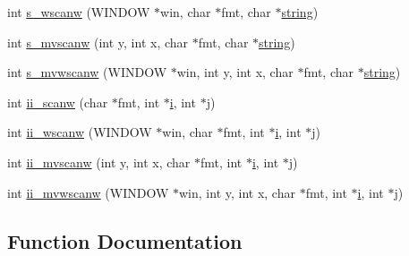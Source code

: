 \begin{DoxyCompactItemize}
\item 
int \hyperlink{C-macros_8c_a261b2a08296fc9699afe31cc2c578410}{s\+\_\+wscanw} (W\+I\+N\+D\+OW $\ast$win, char $\ast$fmt, char $\ast$\hyperlink{what__overview_81_8txt_a7d189cc480786c3c65688ced463aedcb}{string})
\item 
int \hyperlink{C-macros_8c_aadefc5909b2feb200bb34f11b0dd18d1}{s\+\_\+mvscanw} (int y, int x, char $\ast$fmt, char $\ast$\hyperlink{what__overview_81_8txt_a7d189cc480786c3c65688ced463aedcb}{string})
\item 
int \hyperlink{C-macros_8c_ad40ae826be88925237db3a46518ca603}{s\+\_\+mvwscanw} (W\+I\+N\+D\+OW $\ast$win, int y, int x, char $\ast$fmt, char $\ast$\hyperlink{what__overview_81_8txt_a7d189cc480786c3c65688ced463aedcb}{string})
\item 
int \hyperlink{C-macros_8c_a13c589c66da48838bef7ced902997126}{ii\+\_\+scanw} (char $\ast$fmt, int $\ast$\hyperlink{intro__blas1_83_8txt_a8ba82a50c0c2c12d5f6a77f7e4651c0b}{i}, int $\ast$\hyperlink{exit_87_8txt_a8921ef29c441e427867c54bd3b2462ba}{j})
\item 
int \hyperlink{C-macros_8c_a4cca36c361fd3bcc48fdb5d0b723d765}{ii\+\_\+wscanw} (W\+I\+N\+D\+OW $\ast$win, char $\ast$fmt, int $\ast$\hyperlink{intro__blas1_83_8txt_a8ba82a50c0c2c12d5f6a77f7e4651c0b}{i}, int $\ast$\hyperlink{exit_87_8txt_a8921ef29c441e427867c54bd3b2462ba}{j})
\item 
int \hyperlink{C-macros_8c_a620ec84aba8d1a5fadbba5724f1e01b8}{ii\+\_\+mvscanw} (int y, int x, char $\ast$fmt, int $\ast$\hyperlink{intro__blas1_83_8txt_a8ba82a50c0c2c12d5f6a77f7e4651c0b}{i}, int $\ast$\hyperlink{exit_87_8txt_a8921ef29c441e427867c54bd3b2462ba}{j})
\item 
int \hyperlink{C-macros_8c_a5116eef3b9a53d8f12436984bfec0717}{ii\+\_\+mvwscanw} (W\+I\+N\+D\+OW $\ast$win, int y, int x, char $\ast$fmt, int $\ast$\hyperlink{intro__blas1_83_8txt_a8ba82a50c0c2c12d5f6a77f7e4651c0b}{i}, int $\ast$\hyperlink{exit_87_8txt_a8921ef29c441e427867c54bd3b2462ba}{j})
\end{DoxyCompactItemize}


\subsection{Function Documentation}
\mbox{\label{C-macros_8c_a32e22b11dad68fa76c882dc89f0997f1}} 
